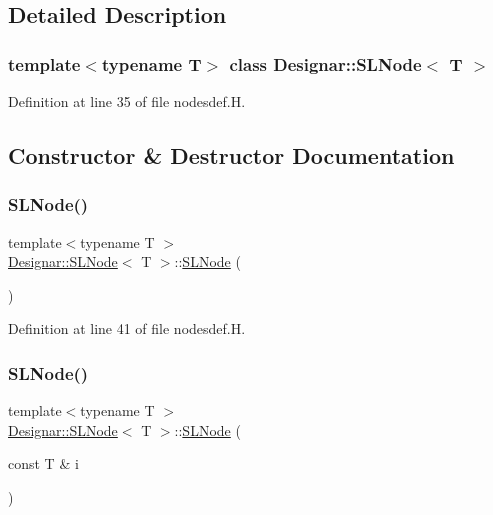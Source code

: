 \subsection{Detailed Description}
\subsubsection*{template$<$typename T$>$\newline
class Designar\+::\+S\+L\+Node$<$ T $>$}



Definition at line 35 of file nodesdef.\+H.



\subsection{Constructor \& Destructor Documentation}
\mbox{\label{class_designar_1_1_s_l_node_ae069c6940aaa2a34a513852f1c3bf3d3}} 
\subsubsection{\texorpdfstring{S\+L\+Node()}{SLNode()}\hspace{0.1cm}{\footnotesize\ttfamily [1/4]}}
{\footnotesize\ttfamily template$<$typename T $>$ \\
\hyperlink{class_designar_1_1_s_l_node}{Designar\+::\+S\+L\+Node}$<$ T $>$\+::\hyperlink{class_designar_1_1_s_l_node}{S\+L\+Node} (\begin{DoxyParamCaption}{ }\end{DoxyParamCaption})\hspace{0.3cm}{\ttfamily [inline]}}



Definition at line 41 of file nodesdef.\+H.

\mbox{\label{class_designar_1_1_s_l_node_af9decf3a4e3809e98d0e9652295c9c1a}} 
\subsubsection{\texorpdfstring{S\+L\+Node()}{SLNode()}\hspace{0.1cm}{\footnotesize\ttfamily [2/4]}}
{\footnotesize\ttfamily template$<$typename T $>$ \\
\hyperlink{class_designar_1_1_s_l_node}{Designar\+::\+S\+L\+Node}$<$ T $>$\+::\hyperlink{class_designar_1_1_s_l_node}{S\+L\+Node} (\begin{DoxyParamCaption}\item[{const T \&}]{i }\end{DoxyParamCaption})\hspace{0.3cm}{\ttfamily [inline]}}



